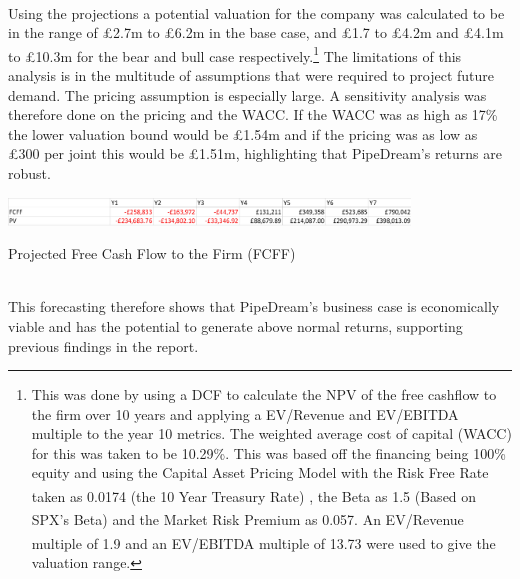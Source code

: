 \documentclass[11pt]{article}		%
\newcommand{\supercite}[1]{\textsuperscript{\cite{#1}}}		%
\begin{document}
    \\ 
    \hspace*{3ex}Using the projections a potential valuation for the company was calculated to be in the range of £2.7m to £6.2m in the base case, and £1.7 to £4.2m and £4.1m to £10.3m for the bear and bull case respectively.\footnote{This was done by using a DCF to calculate the NPV of the free cashflow to the firm over 10 years and applying a EV/Revenue and EV/EBITDA multiple to the year 10 metrics. The weighted average cost of capital (WACC) for this was taken to be 10.29\%. This was based off the financing being 100\% equity and using the Capital Asset Pricing Model with the Risk Free Rate taken as 0.0174 (the 10 Year Treasury Rate) \supercite{Treasury}, the Beta as 1.5 (Based on SPX’s Beta) \supercite{SPX_Beta} and the Market Risk Premium as 0.057\supercite{Risk_Premium}. An EV/Revenue multiple of 1.9 and an EV/EBITDA multiple of 13.73\supercite{SPX_multiple} were used to give the valuation range.} The limitations of this analysis is in the multitude of assumptions that were required to project future demand. The pricing assumption is especially large. A sensitivity analysis was therefore done on the pricing and the WACC. If the WACC was as high as 17\% the lower valuation bound would be £1.54m and if the pricing was as low as £300 per joint this would be £1.51m, highlighting that PipeDream’s returns are robust.
 	            \begin{table}[h]
					\centering
					\includegraphics[width=0.8\textwidth]{7 year fcf forecast.png}
					\caption{Projected Free Cash Flow to the Firm (FCFF)}
					\label{forecast_FCF}
				\end{table}
    \\ 
    \hspace*{3ex}This forecasting therefore shows that PipeDream's business case is economically viable and has the potential to generate above normal returns, supporting previous findings in the report.
		        	        
\end{document}
